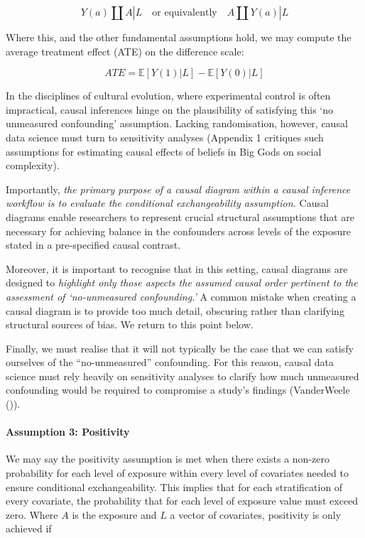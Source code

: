 \documentclass[
  singlecolumn,
  9pt]{article}
\let\oldparagraph\paragraph
\renewcommand{\paragraph}[1]{\oldparagraph{#1}\mbox{}}
\begin{document}
\[
Y(a) \coprod A | L \quad \text{or equivalently} \quad A \coprod Y(a) | L
\]

Where this, and the other fundamental assumptions hold, we may compute
the average treatment effect (ATE) on the difference scale:

\[
ATE = \mathbb{E}[Y(1) | L] - \mathbb{E}[Y(0) | L]
\]

In the disciplines of cultural evolution, where experimental control is
often impractical, causal inferences hinge on the plausibility of
satisfying this `no unmeasured confounding' assumption. Lacking
randomisation, however, causal data science must turn to sensitivity
analyses (Appendix 1 critiques such assumptions for estimating causal
effects of beliefs in Big Gods on social complexity).

Importantly, \emph{the primary purpose of a causal diagram within a
causal inference workflow is to evaluate the conditional exchangeability
assumption.} Causal diagrams enable researchers to represent crucial
structural assumptions that are necessary for achieving balance in the
confounders across levels of the exposure stated in a pre-specified
causal contrast.

Moreover, it is important to recognise that in this setting, causal
diagrams are designed to \emph{highlight only those aspects the assumed
causal order pertinent to the assessment of `no-unmeasured
confounding.'} A common mistake when creating a causal diagram is to
provide too much detail, obscuring rather than clarifying structural
sources of bias. We return to this point below.

Finally, we must realise that it will not typically be the case that we
can satisfy ourselves of the ``no-unmeasured'' confounding. For this
reason, causal data science must rely heavily on sensitivity analyses to
clarify how much unmeasured confounding would be required to compromise
a study's findings (VanderWeele ()).

\paragraph{Assumption 3: Positivity}\label{assumption-3-positivity}

We may say the positivity assumption is met when there exists a non-zero
probability for each level of exposure within every level of covariates
needed to ensure conditional exchangeability. This implies that for each
stratification of every covariate, the probability that for each level
of exposure value must exceed zero. Where \(A\) is the exposure and
\(L\) a vector of covariates, positivity is only achieved if
\end{document}
